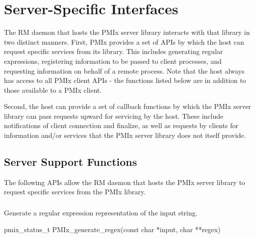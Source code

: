 \chapter{Server-Specific Interfaces}
\label{chap:api_server}

The \ac{RM} daemon that hosts the \ac{PMIx} server library interacts with that library in two distinct manners. First, \ac{PMIx} provides a set of \acp{API} by which the host can request specific services from its library. This includes generating regular expressions, registering information to be passed to client processes, and requesting information on behalf of a remote process. Note that the host always has access to all \ac{PMIx} client \acp{API} - the functions listed below are in addition to those available to a \ac{PMIx} client.

Second, the host can provide a set of callback functions by which the \ac{PMIx} server library can pass requests upward for servicing by the host. These include notifications of client connection and finalize, as well as requests by clients for information and/or services that the \ac{PMIx} server library does not itself provide.

\section{Server Support Functions}

The following \acp{API} allow the \ac{RM} daemon that hosts the \ac{PMIx} server library to request specific services from the \ac{PMIx} library.

\subsection{}

\summary

Generate a regular expression representation of the input string.

\format

\cspecificstart
\begin{codepar}
pmix_status_t
PMIx_generate_regex(const char *input, char **regex)
\end{codepar}
\cspecificend

\begin{arglist}
\end{arglist}

